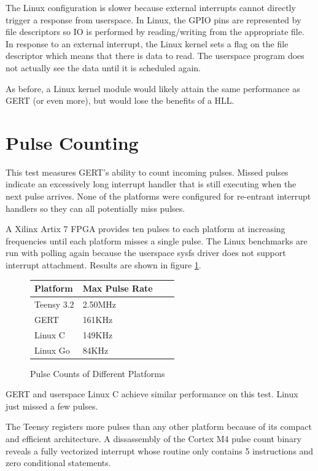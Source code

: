 The Linux configuration is slower because external interrupts cannot directly trigger a response
from userspace. In Linux, the GPIO pins are represented by file descriptors so
IO is performed by reading/writing from the appropriate file. In response to an external interrupt,
the Linux kernel sets a flag on the file descriptor which means that there is data to read. The userspace
program does not actually see the data until it is scheduled again.

As before, a Linux kernel module would likely attain the same performance as GERT
(or even more), but would lose the benefits of a HLL.


\section{Pulse Counting}\label{sec:pulse_count}
This test measures GERT's ability to count incoming pulses. Missed pulses
indicate an excessively long interrupt handler that is still executing when the next
pulse arrives. None of the platforms were configured for re-entrant interrupt handlers
so they can all potentially miss pulses.

A Xilinx Artix 7 FPGA provides ten pulses to each platform at increasing frequencies
until each platform misses a single pulse. The Linux benchmarks are run with polling
again because the
userspace sysfs driver does not support interrupt attachment.
Results are shown in figure \ref{fig:counter}.


\begin{figure} [h]
\begin{center}
  \begin{tabular}{ | l | l | l | l |}
    \hline
    Platform & Max Pulse Rate \\ \hline
    Teensy 3.2 & 2.50MHz\\ \hline
    GERT & 161KHz\\ \hline
    Linux C & 149KHz\\ \hline
    Linux Go & 84KHz\\
    \hline
  \end{tabular}
\end{center}
  \caption{Pulse Counts of Different Platforms}  \label{fig:counter}
\end{figure}

GERT and userspace Linux C achieve similar performance on this test.
Linux just missed a few pulses.

The Teensy registers more pulses than any other platform because of its
compact and efficient architecture. A dissassembly of the Cortex M4 pulse count binary
reveals a fully vectorized interrupt whose routine only contains 5
instructions and zero conditional statements.

